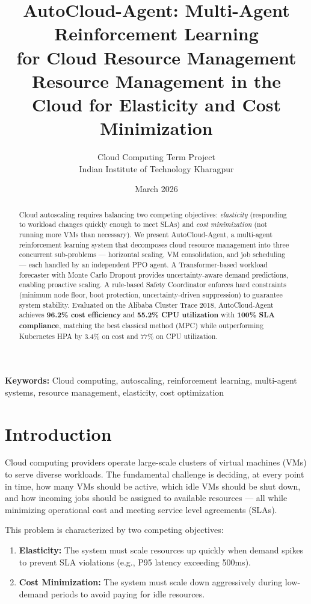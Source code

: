 \documentclass[12pt,a4paper]{article}
\title{\textbf{AutoCloud-Agent: Multi-Agent Reinforcement Learning\\
for Cloud Resource Management}\\[8pt]
\large Resource Management in the Cloud for Elasticity and Cost Minimization}
\author{Cloud Computing Term Project\\
Indian Institute of Technology Kharagpur}
\date{March 2026}
\begin{document}
\maketitle

\begin{abstract}
Cloud autoscaling requires balancing two competing objectives: \textit{elasticity}
(responding to workload changes quickly enough to meet SLAs) and \textit{cost
minimization} (not running more VMs than necessary). We present AutoCloud-Agent,
a multi-agent reinforcement learning system that decomposes cloud resource
management into three concurrent sub-problems --- horizontal scaling,
VM consolidation, and job scheduling --- each handled by an independent PPO
agent. A Transformer-based workload forecaster with Monte Carlo Dropout provides
uncertainty-aware demand predictions, enabling proactive scaling. A rule-based
Safety Coordinator enforces hard constraints (minimum node floor, boot
protection, uncertainty-driven suppression) to guarantee system stability.
Evaluated on the Alibaba Cluster Trace 2018, AutoCloud-Agent achieves
\textbf{96.2\% cost efficiency} and \textbf{55.2\% CPU utilization} with
\textbf{100\% SLA compliance}, matching the best classical method (MPC) while
outperforming Kubernetes HPA by 3.4\% on cost and 77\% on CPU utilization.
\end{abstract}

\textbf{Keywords:} Cloud computing, autoscaling, reinforcement learning,
multi-agent systems, resource management, elasticity, cost optimization

\newpage
\tableofcontents
\newpage


\section{Introduction}


Cloud computing providers operate large-scale clusters of virtual machines (VMs)
to serve diverse workloads. The fundamental challenge is deciding, at every point
in time, how many VMs should be active, which idle VMs should be shut down, and
how incoming jobs should be assigned to available resources --- all while
minimizing operational cost and meeting service level agreements (SLAs).

This problem is characterized by two competing objectives:

\begin{enumerate}
  \item \textbf{Elasticity:} The system must scale resources up quickly when
        demand spikes to prevent SLA violations (e.g., P95 latency exceeding
        500ms).
  \item \textbf{Cost Minimization:} The system must scale down aggressively
        during low-demand periods to avoid paying for idle resources.
\end{enumerate}
\end{document}
